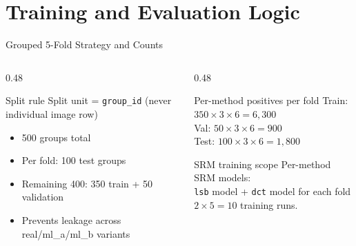 \documentclass[aspectratio=169,11pt]{beamer}
\begin{document}
\section{Training and Evaluation Logic}

\begin{frame}{Grouped 5-Fold Strategy and Counts}
\small
\begin{columns}[T]
\begin{column}{0.48\textwidth}
\begin{block}{Split rule}
Split unit = \texttt{group\_id} (never individual image row)
\end{block}
\begin{itemize}
\item 500 groups total
\item Per fold: 100 test groups
\item Remaining 400: 350 train + 50 validation
\item Prevents leakage across real/ml\_a/ml\_b variants
\end{itemize}
\end{column}
\begin{column}{0.48\textwidth}
\begin{block}{Per-method positives per fold}
\scriptsize
Train: \(350 \times 3 \times 6 = 6{,}300\)\\
Val: \(50 \times 3 \times 6 = 900\)\\
Test: \(100 \times 3 \times 6 = 1{,}800\)
\end{block}
\begin{alertblock}{SRM training scope}
\small
Per-method SRM models:\\
\texttt{lsb} model + \texttt{dct} model for each fold\\
\(2 \times 5 = 10\) training runs.
\end{alertblock}
\end{column}
\end{columns}
\end{frame}
\end{document}
